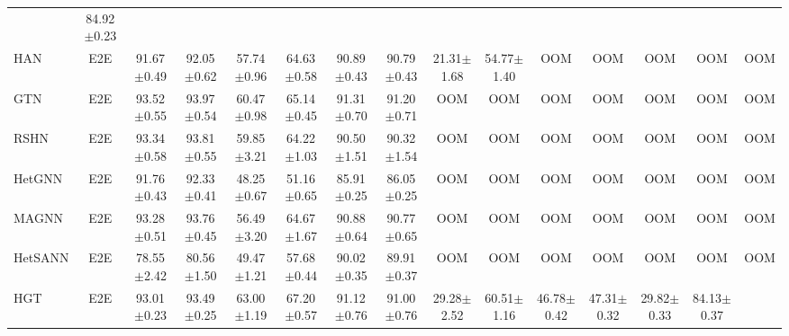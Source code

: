 \documentclass[lettersize,journal]{IEEEtran}
\begin{document}
\begin{table*}[!tp]
{\begin{tabular}{l c c c c c c c c c c c c c c}
                                                                                                                                                                                                             & 84.92$\pm$0.23\\HAN            & E2E     & 91.67$\pm$0.49 & 92.05$\pm$0.62 & 57.74$\pm$0.96 & 64.63$\pm$0.58 & 90.89$\pm$0.43 & 90.79$\pm$0.43 & 21.31$\pm$1.68 & 54.77$\pm$1.40 & OOM & OOM & OOM & OOM & OOM   \\GTN            & E2E     & 93.52$\pm$0.55 & 93.97$\pm$0.54 & 60.47$\pm$0.98 & 65.14$\pm$0.45 & 91.31$\pm$0.70 & 91.20$\pm$0.71 & OOM            & OOM            & OOM & OOM & OOM & OOM & OOM   \\RSHN           & E2E     & 93.34$\pm$0.58 & 93.81$\pm$0.55 & 59.85$\pm$3.21 & 64.22$\pm$1.03 & 90.50$\pm$1.51 & 90.32$\pm$1.54 & OOM            & OOM            & OOM & OOM & OOM & OOM & OOM   \\HetGNN         & E2E     & 91.76$\pm$0.43 & 92.33$\pm$0.41 & 48.25$\pm$0.67 & 51.16$\pm$0.65 & 85.91$\pm$0.25 & 86.05$\pm$0.25 & OOM            & OOM            & OOM & OOM & OOM & OOM & OOM   \\MAGNN          & E2E     & 93.28$\pm$0.51 & 93.76$\pm$0.45 & 56.49$\pm$3.20 & 64.67$\pm$1.67 & 90.88$\pm$0.64 & 90.77$\pm$0.65 & OOM            & OOM            & OOM & OOM & OOM & OOM & OOM  \\HetSANN        & E2E     & 78.55$\pm$2.42 & 80.56$\pm$1.50 & 49.47$\pm$1.21 & 57.68$\pm$0.44 & 90.02$\pm$0.35 & 89.91$\pm$0.37 & OOM            & OOM            & OOM & OOM & OOM & OOM & OOM  \\HGT            & E2E     & 93.01$\pm$0.23 & 93.49$\pm$0.25 & 63.00$\pm$1.19 & 67.20$\pm$0.57 & 91.12$\pm$0.76 & 91.00$\pm$0.76 & 29.28$\pm$2.52 & 60.51$\pm$1.16 & 46.78$\pm$0.42
                                                                                                                                                                               & 47.31$\pm$0.32  
                                                                                                                                                                                          & 29.82$\pm$0.33 
                                                                                                                                                                                            & 84.13$\pm$0.37 

\end{tabular}}
\end{table*}
\end{document}
